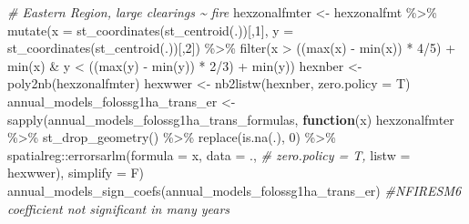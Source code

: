\documentclass[10pt,landscape,a3paper]{article}
\newenvironment{Shaded}{\begin{snugshade}}{\end{snugshade}}
\newcommand{\AttributeTok}[1]{\textcolor[rgb]{0.77,0.63,0.00}{#1}}
\newcommand{\CommentTok}[1]{\textcolor[rgb]{0.56,0.35,0.01}{\textit{#1}}}
\newcommand{\ControlFlowTok}[1]{\textcolor[rgb]{0.13,0.29,0.53}{\textbf{#1}}}
\newcommand{\DecValTok}[1]{\textcolor[rgb]{0.00,0.00,0.81}{#1}}
\newcommand{\FunctionTok}[1]{\textcolor[rgb]{0.00,0.00,0.00}{#1}}
\newcommand{\NormalTok}[1]{#1}
\newcommand{\OtherTok}[1]{\textcolor[rgb]{0.56,0.35,0.01}{#1}}
\newcommand{\SpecialCharTok}[1]{\textcolor[rgb]{0.00,0.00,0.00}{#1}}
\begin{document}
\begin{Shaded}
\begin{Highlighting}[]
\CommentTok{\# Eastern Region, large clearings \textasciitilde{} fire}
\NormalTok{hexzonalfmter }\OtherTok{\textless{}{-}}\NormalTok{ hexzonalfmt }\SpecialCharTok{\%\textgreater{}\%}
  \FunctionTok{mutate}\NormalTok{(}\AttributeTok{x =} \FunctionTok{st\_coordinates}\NormalTok{(}\FunctionTok{st\_centroid}\NormalTok{(.))[,}\DecValTok{1}\NormalTok{], }\AttributeTok{y =} \FunctionTok{st\_coordinates}\NormalTok{(}\FunctionTok{st\_centroid}\NormalTok{(.))[,}\DecValTok{2}\NormalTok{]) }\SpecialCharTok{\%\textgreater{}\%}
  \FunctionTok{filter}\NormalTok{(x }\SpecialCharTok{\textgreater{}}\NormalTok{ ((}\FunctionTok{max}\NormalTok{(x) }\SpecialCharTok{{-}} \FunctionTok{min}\NormalTok{(x)) }\SpecialCharTok{*} \DecValTok{4}\SpecialCharTok{/}\DecValTok{5}\NormalTok{) }\SpecialCharTok{+} \FunctionTok{min}\NormalTok{(x) }\SpecialCharTok{\&}\NormalTok{ y }\SpecialCharTok{\textless{}}\NormalTok{ ((}\FunctionTok{max}\NormalTok{(y) }\SpecialCharTok{{-}} \FunctionTok{min}\NormalTok{(y)) }\SpecialCharTok{*} \DecValTok{2}\SpecialCharTok{/}\DecValTok{3}\NormalTok{) }\SpecialCharTok{+} \FunctionTok{min}\NormalTok{(y))}
\NormalTok{hexnber }\OtherTok{\textless{}{-}} \FunctionTok{poly2nb}\NormalTok{(hexzonalfmter)}
\NormalTok{hexwwer }\OtherTok{\textless{}{-}} \FunctionTok{nb2listw}\NormalTok{(hexnber, }\AttributeTok{zero.policy =}\NormalTok{ T)}
\NormalTok{annual\_models\_folossg1ha\_trans\_er }\OtherTok{\textless{}{-}} \FunctionTok{sapply}\NormalTok{(annual\_models\_folossg1ha\_trans\_formulas,}
                        \ControlFlowTok{function}\NormalTok{(x)}
\NormalTok{                          hexzonalfmter }\SpecialCharTok{\%\textgreater{}\%}
                          \FunctionTok{st\_drop\_geometry}\NormalTok{() }\SpecialCharTok{\%\textgreater{}\%}
                          \FunctionTok{replace}\NormalTok{(}\FunctionTok{is.na}\NormalTok{(.), }\DecValTok{0}\NormalTok{) }\SpecialCharTok{\%\textgreater{}\%}
\NormalTok{                          spatialreg}\SpecialCharTok{::}\FunctionTok{errorsarlm}\NormalTok{(}\AttributeTok{formula =}\NormalTok{ x,}
                                                 \AttributeTok{data =}\NormalTok{ ., }\CommentTok{\# zero.policy = T,}
                                                 \AttributeTok{listw =}\NormalTok{ hexwwer),}
                        \AttributeTok{simplify =}\NormalTok{ F)}
\FunctionTok{annual\_models\_sign\_coefs}\NormalTok{(annual\_models\_folossg1ha\_trans\_er) }\CommentTok{\#NFIRESM6 coefficient not significant in many years}


\end{Highlighting}
\end{Shaded}
\end{document}
